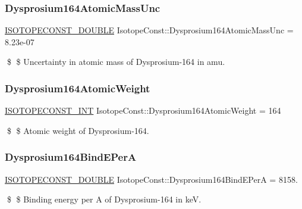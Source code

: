 \subsubsection{\texorpdfstring{Dysprosium164\+Atomic\+Mass\+Unc}{Dysprosium164AtomicMassUnc}}
{\footnotesize\ttfamily \mbox{\hyperlink{group___isotope_const-_macros_ga8f45a7272ce02c0b4c65c44636ed719a}{I\+S\+O\+T\+O\+P\+E\+C\+O\+N\+S\+T\+\_\+\+D\+O\+U\+B\+LE}} Isotope\+Const\+::\+Dysprosium164\+Atomic\+Mass\+Unc = 8.\+23e-\/07}

\$ \$ Uncertainty in atomic mass of Dysprosium-\/164 in amu. \mbox{\label{group___isotope_const-_dysprosium-_dy164_ga5d6ec03afa8aed1193f171b8dd6c491c}} 
\subsubsection{\texorpdfstring{Dysprosium164\+Atomic\+Weight}{Dysprosium164AtomicWeight}}
{\footnotesize\ttfamily \mbox{\hyperlink{group___isotope_const-_macros_ga5f18360b3e99483a35c32d789e62621c}{I\+S\+O\+T\+O\+P\+E\+C\+O\+N\+S\+T\+\_\+\+I\+NT}} Isotope\+Const\+::\+Dysprosium164\+Atomic\+Weight = 164}

\$ \$ Atomic weight of Dysprosium-\/164. \mbox{\label{group___isotope_const-_dysprosium-_dy164_gaa44e087047d2ed29f39a2e9ddc3bfe90}} 
\subsubsection{\texorpdfstring{Dysprosium164\+Bind\+E\+PerA}{Dysprosium164BindEPerA}}
{\footnotesize\ttfamily \mbox{\hyperlink{group___isotope_const-_macros_ga8f45a7272ce02c0b4c65c44636ed719a}{I\+S\+O\+T\+O\+P\+E\+C\+O\+N\+S\+T\+\_\+\+D\+O\+U\+B\+LE}} Isotope\+Const\+::\+Dysprosium164\+Bind\+E\+PerA = 8158.}

\$ \$ Binding energy per A of Dysprosium-\/164 in keV. \mbox{\label{group___isotope_const-_dysprosium-_dy164_ga4add95c4ff7572e36931798ade8b71e5}} 
